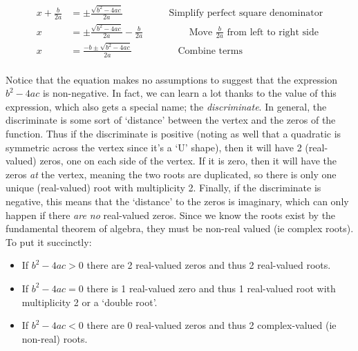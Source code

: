 \documentclass{ximeraXloud}
\begin{document}
\begin{example}
\begin{align*}
                x + \frac{b}{2a} & = \pm \frac{\sqrt{b^2-4ac}}{2a} \hspace{2cm} \text{Simplify perfect square denominator} \\
                x &= \pm \frac{\sqrt{b^2-4ac}}{2a} -\frac{b}{2a} \hspace{2cm} \text{Move $\frac{b}{2a}$ from left to right side} \\
                x &= \frac{-b \pm \sqrt{b^2-4ac}}{2a} \hspace{2cm} \text{Combine terms} \\
            \end{align*}
        \end{example}%
        
        Notice that the equation makes no assumptions to suggest that the expression $b^2 - 4ac$ is non-negative. In fact, we can learn a lot thanks to the value of this expression, which also gets a special name; the \textit{discriminate}. In general, the discriminate is some sort of `distance' between the vertex and the zeros of the function. Thus if the discriminate is positive (noting as well that a quadratic is symmetric across the vertex since it's a `U' shape), then it will have 2 (real-valued) zeros, one on each side of the vertex. If it is zero, then it will have the zeros \textit{at} the vertex, meaning the two roots are duplicated, so there is only one unique (real-valued) root with multiplicity 2. Finally, if the discriminate is negative, this means that the `distance' to the zeros is imaginary, which can only happen if there \textit{are no} real-valued zeros. Since we know the roots exist by the fundamental theorem of algebra, they must be non-real valued (ie complex roots). To put it succinctly:
        
        \begin{itemize}
            \item If $b^2 - 4ac > 0$ there are 2 real-valued zeros and thus 2 real-valued roots.
            \item If $b^2 - 4ac = 0$ there is 1 real-valued zero and thus 1 real-valued root with multiplicity 2 or a `double root'.
            \item If $b^2 - 4ac < 0$ there are 0 real-valued zeros and thus 2 complex-valued (ie non-real) roots.
        \end{itemize}
\end{document}
